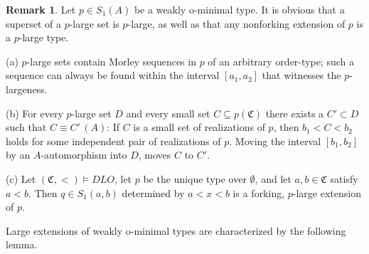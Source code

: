 \documentclass{amsart}
\theoremstyle{definition}
\theoremstyle{definition}
\newtheorem{Remark}[Theorem]{Remark}
\newcommand{\Mon}{\mathfrak C}
\begin{document}
\begin{Remark}\label{Remark_p_large} Let $p\in S_1(A)$ be a weakly o-minimal type.
It is obvious that a superset of a $p$-large set is $p$-large,  as well as that any nonforking extension of $p$ is a $p$-large type. 
 
(a) $p$-large sets contain Morley sequences in $p$ of an arbitrary order-type; such a sequence can always be found within the interval $[a_1,a_2]$ that witnesses the $p$-largeness.    
 
(b) For every $p$-large set $D$ and every small set $C\subseteq p(\Mon)$ there exists a $C'\subset D$ such that $C\equiv C'\,(A)$: If $C$ is a small set of realizations of $p$, then $b_1<C<b_2$ holds for some independent pair of realizations of $p$. Moving the interval $[b_1,b_2]$ by an $A$-automorphism into $D$, moves $C$ to $C'$.     

(c) Let $(\Mon,<)\models DLO$, let $p$ be the unique type over $\emptyset$, and let $a,b\in\Mon$ satisfy $a<b$. Then $q\in S_1(a,b)$ determined by $a<x<b$ is a forking, $p$-large extension of $p$. 
\end{Remark}



 
Large extensions of weakly o-minimal types are characterized by the following lemma.
\end{document}
